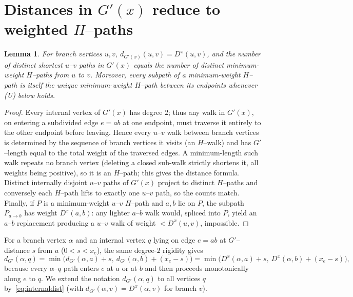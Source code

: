 \documentclass{amsart}
\newtheorem{lemma}{Lemma}
\theoremstyle{definition}
\begin{document}
\section{Distances in $G'(x)$ reduce to weighted $H$--paths}

\begin{lemma}\label{lem:distbranch}
For branch vertices $u,v$, $d_{G'(x)}(u,v)=D^x(u,v)$, and the number of distinct
shortest $u$--$v$ paths in $G'(x)$ equals the number of distinct minimum-weight
$H$--paths from $u$ to $v$. Moreover, every subpath of a minimum-weight
$H$--path is itself the unique minimum-weight $H$--path between its endpoints
whenever \textnormal{(U)} below holds.
\end{lemma}

\begin{proof}
Every internal vertex of $G'(x)$ has degree $2$; thus any walk in $G'(x)$, on
entering a subdivided edge $e=ab$ at one endpoint, must traverse it entirely to
the other endpoint before leaving. Hence every $u$--$v$ walk between branch
vertices is determined by the sequence of branch vertices it visits (an
$H$--walk) and has $G'$--length equal to the total weight of the traversed
edges. A minimum-length such walk repeats no branch vertex (deleting a closed
sub-walk strictly shortens it, all weights being positive), so it is an
$H$--path; this gives the distance formula. Distinct internally disjoint
$u$--$v$ paths of $G'(x)$ project to distinct $H$--paths and conversely each
$H$--path lifts to exactly one $u$--$v$ path, so the counts match. Finally, if
$P$ is a minimum-weight $u$--$v$ $H$--path and $a,b$ lie on $P$, the subpath
$P_{a\to b}$ has weight $D^x(a,b)$: any lighter $a$--$b$ walk would, spliced into
$P$, yield an $a$--$b$ replacement producing a $u$--$v$ walk of weight
$<D^x(u,v)$, impossible.
\end{proof}

For a branch vertex $\alpha$ and an internal vertex $q$ lying on edge $e=ab$ at
$G'$--distance $s$ from $a$ ($0<s<x_e$), the same degree-$2$ rigidity gives
\begin{equation}\label{eq:internaldist}
d_{G'}(\alpha,q)=\min\!\big(d_{G'}(\alpha,a)+s,\ d_{G'}(\alpha,b)+(x_e-s)\big)
=\min\!\big(D^x(\alpha,a)+s,\ D^x(\alpha,b)+(x_e-s)\big),
\end{equation}
because every $\alpha$--$q$ path enters $e$ at $a$ or at $b$ and then proceeds
monotonically along $e$ to $q$. We extend the notation $d_{G'}(\alpha,q)$ to all
vertices $q$ by~\eqref{eq:internaldist} (with $d_{G'}(\alpha,v)=D^x(\alpha,v)$
for branch $v$).
\end{document}
